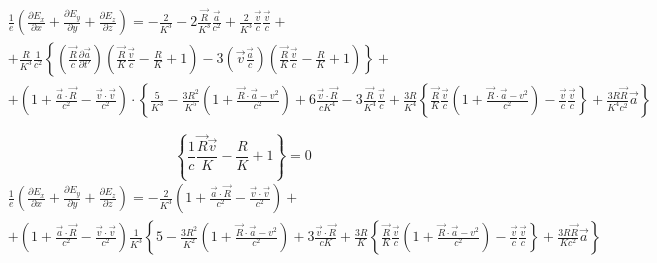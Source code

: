 \documentclass[11pt]{article}
\begin{document}
\[\begin{align}
  & \frac{1}{e}\left( \frac{\partial {{E}_{x}}}{\partial x}+\frac{\partial {{E}_{y}}}{\partial y}+\frac{\partial {{E}_{z}}}{\partial z} \right)=-\frac{2}{{{K}^{3}}}-2\frac{\overrightarrow{R}}{{{K}^{3}}}\frac{\overrightarrow{a}}{{{c}^{2}}}+\frac{2}{{{K}^{3}}}\frac{\overrightarrow{v}}{c}\frac{\overrightarrow{v}}{c}+ \\ 
 & +\frac{R}{{{K}^{3}}}\frac{1}{{{c}^{2}}}\left\{ \left( \frac{\overrightarrow{R}}{c}\frac{\partial \overrightarrow{a}}{\partial t'} \right)\left( \frac{\overrightarrow{R}}{K}\frac{\overrightarrow{v}}{c}-\frac{R}{K}+1 \right)-3\left( \overrightarrow{v}\frac{\overrightarrow{a}}{c} \right)\left( \frac{\overrightarrow{R}}{K}\frac{\overrightarrow{v}}{c}-\frac{R}{K}+1 \right) \right\}+ \\ 
 & +\left( 1+\frac{\overrightarrow{a}\cdot \overrightarrow{R}}{{{c}^{2}}}-\frac{\overrightarrow{v}\cdot \overrightarrow{v}}{{{c}^{2}}} \right)\cdot \left\{ \frac{5}{{{K}^{3}}}-\frac{3{{R}^{2}}}{{{K}^{5}}}\left( 1+\frac{\overrightarrow{R}\cdot \overrightarrow{a}-{{v}^{2}}}{{{c}^{2}}} \right)+6\frac{\overrightarrow{v}\cdot \overrightarrow{R}}{c{{K}^{4}}}-3\frac{\overrightarrow{R}}{{{K}^{4}}}\frac{\overrightarrow{v}}{c}+\frac{3R}{{{K}^{4}}}\left\{ \frac{\overrightarrow{R}}{K}\frac{\overrightarrow{v}}{c}\left( 1+\frac{\overrightarrow{R}\cdot \overrightarrow{a}-{{v}^{2}}}{{{c}^{2}}} \right)-\frac{\overrightarrow{v}}{c}\frac{\overrightarrow{v}}{c} \right\}+\frac{3R\overrightarrow{R}}{{{K}^{4}}{{c}^{2}}}\overrightarrow{a} \right\} \\ 
 &  \\ 
\end{align}\]
\[\left\{ \frac{1}{c}\frac{\overrightarrow{R}\overrightarrow{v}}{K}-\frac{R}{K}+1 \right\}=0\]
\[\begin{align}
  & \frac{1}{e}\left( \frac{\partial {{E}_{x}}}{\partial x}+\frac{\partial {{E}_{y}}}{\partial y}+\frac{\partial {{E}_{z}}}{\partial z} \right)=-\frac{2}{{{K}^{3}}}\left( 1+\frac{\overrightarrow{a}\cdot \overrightarrow{R}}{{{c}^{2}}}-\frac{\overrightarrow{v}\cdot \overrightarrow{v}}{{{c}^{2}}} \right)+ \\ 
 & +\left( 1+\frac{\overrightarrow{a}\cdot \overrightarrow{R}}{{{c}^{2}}}-\frac{\overrightarrow{v}\cdot \overrightarrow{v}}{{{c}^{2}}} \right)\frac{1}{{{K}^{3}}}\left\{ 5-\frac{3{{R}^{2}}}{{{K}^{2}}}\left( 1+\frac{\overrightarrow{R}\cdot \overrightarrow{a}-{{v}^{2}}}{{{c}^{2}}} \right)+3\frac{\overrightarrow{v}\cdot \overrightarrow{R}}{cK}+\frac{3R}{K}\left\{ \frac{\overrightarrow{R}}{K}\frac{\overrightarrow{v}}{c}\left( 1+\frac{\overrightarrow{R}\cdot \overrightarrow{a}-{{v}^{2}}}{{{c}^{2}}} \right)-\frac{\overrightarrow{v}}{c}\frac{\overrightarrow{v}}{c} \right\}+\frac{3R\overrightarrow{R}}{K{{c}^{2}}}\overrightarrow{a} \right\} \\
\end{align}\]
\end{document}
